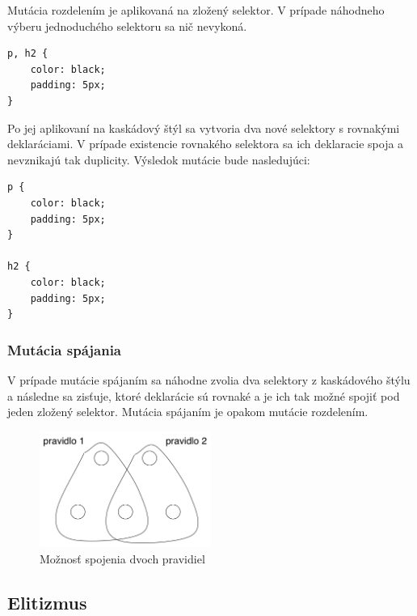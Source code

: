 Mutácia rozdelením je aplikovaná na zložený selektor. V prípade náhodneho výberu jednoduchého selektoru sa nič nevykoná.

\begin{verbatim}
p, h2 {
    color: black; 
    padding: 5px;
}

\end{verbatim}

Po jej aplikovaní na kaskádový štýl sa vytvoria dva nové selektory s rovnakými deklaráciami. V prípade existencie rovnakého selektora sa ich deklaracie spoja a nevznikajú tak duplicity. Výsledok mutácie bude nasledujúci:

\begin{verbatim}
p { 
    color: black; 
    padding: 5px;
}

h2 {
    color: black; 
    padding: 5px;
}
\end{verbatim}


\subsubsection{Mutácia spájania} %
\label{ssub:sp_janie}

V prípade mutácie spájaním sa náhodne zvolia dva selektory z kaskádového štýlu a následne sa zisťuje, ktoré deklarácie sú rovnaké a je ich tak možné spojiť pod jeden zložený selektor. Mutácia spájaním je opakom mutácie rozdelením.

\begin{figure}[H]
	\centering
	\includegraphics[width=0.5\textwidth]{rules.png}
	\caption[Možnosť spojenia dvoch pravidiel]{
		Možnosť spojenia dvoch pravidiel}
	\label{fig: rules}
\end{figure}



\subsection{Elitizmus} %
\label{sub:elitizmus}

